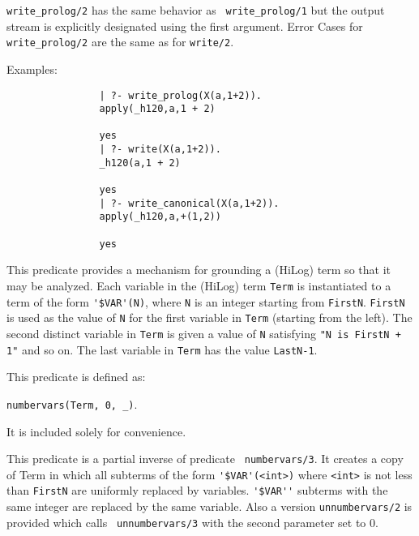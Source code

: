 \begin{description}
   {\tt write\_prolog/2} has the same behavior as {\tt
     write\_prolog/1} but the output stream is explicitly designated
   using the first argument.  Error Cases for {\tt write\_prolog/2}
   are the same as for {\tt write/2}.

    Examples:
    {\footnotesize
     \begin{verbatim}
                | ?- write_prolog(X(a,1+2)).
                apply(_h120,a,1 + 2)

                yes
                | ?- write(X(a,1+2)).
                _h120(a,1 + 2)

                yes
                | ?- write_canonical(X(a,1+2)).
                apply(_h120,a,+(1,2))

                yes
     \end{verbatim}}


    This predicate provides a mechanism for grounding a (HiLog) term
    so that it may be analyzed.  Each variable in the (HiLog) term
    {\tt Term} is instantiated to a term of the form \verb|'$VAR'(N)|,
    where {\tt N} is an integer starting from {\tt FirstN}.  
    {\tt FirstN} is used as the value of {\tt N} for the first
    variable in {\tt Term} (starting from the left). The second distinct
    variable in {\tt Term} is given a value of {\tt N} satisfying
    {\tt "N is FirstN + 1"} and so on.  The last variable in {\tt Term}
    has the value {\tt LastN-1}.

    This predicate is defined as:
    \begin{center}
    {\tt   numbervars(Term, 0, \_)}.
    \end{center}
    It is included solely for convenience.

    This predicate is a partial inverse of predicate {\tt
    numbervars/3}.  It creates a copy of Term in which all subterms of
    the form \verb|'$VAR'(<int>)| where \verb|<int>| is not less than
    {\tt FirstN} are uniformly replaced by variables.  \verb|'$VAR''|
    subterms with the same integer are replaced by the same variable.
    Also a version {\tt unnumbervars/2} is provided which calls {\tt
    unnumbervars/3} with the second parameter set to 0.

\end{description}

